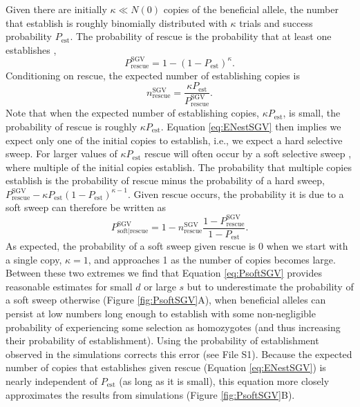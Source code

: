 \documentclass[]{article}
\begin{document}
Given there are initially $\kappa\ll N(0)$ copies of the beneficial allele, the number that establish is roughly binomially distributed with $\kappa$ trials and success probability $P_\mathrm{est}$.
The probability of rescue is the probability that at least one establishes \citep[c.f., equation 2 in][]{orr2014population},
\begin{equation}
P_\mathrm{rescue}^\mathrm{SGV} = 1-(1-P_\mathrm{est})^\kappa.
\end{equation}
Conditioning on rescue, the expected number of establishing copies is
\begin{equation}\label{eq:ENestSGV}
n^\mathrm{SGV}_\mathrm{rescue} = \frac{\kappa P_\mathrm{est}}{P^\mathrm{SGV}_\mathrm{rescue}}.
\end{equation}
Note that when the expected number of establishing copies, $\kappa P_\mathrm{est}$, is small, the probability of rescue is roughly $\kappa P_\mathrm{est}$.
Equation \ref{eq:ENestSGV} then implies we expect only one of the initial copies to establish, i.e., we expect a hard selective sweep.
For larger values of $\kappa P_\mathrm{est}$ rescue will often occur by a soft selective sweep \citep{hermisson2005soft}, where multiple of the initial copies establish.
The probability that multiple copies establish is the probability of rescue minus the probability of a hard sweep, $P^\mathrm{SGV}_\mathrm{rescue} - \kappa P_\mathrm{est} (1-P_\mathrm{est})^{\kappa-1}$.
Given rescue occurs, the probability it is due to a soft sweep can therefore be written as
\begin{equation}\label{eq:PsoftSGV}
P_{\mathrm{soft}|\mathrm{rescue}}^\mathrm{SGV} = 1 -n^\mathrm{SGV}_\mathrm{rescue} \frac{1-P_\mathrm{rescue}^\mathrm{SGV}}{1-P_\mathrm{est}}.
\end{equation}
As expected, the probability of a soft sweep given rescue is 0 when we start with a single copy, $\kappa=1$, and approaches 1 as the number of copies becomes large.
Between these two extremes we find that Equation \ref{eq:PsoftSGV} provides reasonable estimates for small $d$ or large $s$ but to underestimate the probability of a soft sweep otherwise (Figure \ref{fig:PsoftSGV}A), when beneficial alleles can persist at low numbers long enough to establish with some non-negligible probability of experiencing some selection as homozygotes (and thus increasing their probability of establishment).
Using the probability of establishment observed in the simulations corrects this error (see File S1).
Because the expected number of copies that establishes given rescue (Equation \ref{eq:ENestSGV}) is nearly independent of $P_\mathrm{est}$ (as long as it is small), this equation more closely approximates the results from simulations (Figure \ref{fig:PsoftSGV}B).
\end{document}
